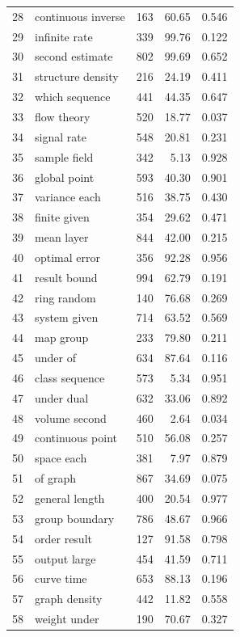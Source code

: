 \documentclass[11pt]{article}
\begin{document}
\begin{longtable}{rlrrr}
  28 & continuous inverse & 163 & 60.65 & 0.546 \\
  29 & infinite rate & 339 & 99.76 & 0.122 \\
  30 & second estimate & 802 & 99.69 & 0.652 \\
  31 & structure density & 216 & 24.19 & 0.411 \\
  32 & which sequence & 441 & 44.35 & 0.647 \\
  33 & flow theory & 520 & 18.77 & 0.037 \\
  34 & signal rate & 548 & 20.81 & 0.231 \\
  35 & sample field & 342 & 5.13 & 0.928 \\
  36 & global point & 593 & 40.30 & 0.901 \\
  37 & variance each & 516 & 38.75 & 0.430 \\
  38 & finite given & 354 & 29.62 & 0.471 \\
  39 & mean layer & 844 & 42.00 & 0.215 \\
  40 & optimal error & 356 & 92.28 & 0.956 \\
  41 & result bound & 994 & 62.79 & 0.191 \\
  42 & ring random & 140 & 76.68 & 0.269 \\
  43 & system given & 714 & 63.52 & 0.569 \\
  44 & map group & 233 & 79.80 & 0.211 \\
  45 & under of & 634 & 87.64 & 0.116 \\
  46 & class sequence & 573 & 5.34 & 0.951 \\
  47 & under dual & 632 & 33.06 & 0.892 \\
  48 & volume second & 460 & 2.64 & 0.034 \\
  49 & continuous point & 510 & 56.08 & 0.257 \\
  50 & space each & 381 & 7.97 & 0.879 \\
  51 & of graph & 867 & 34.69 & 0.075 \\
  52 & general length & 400 & 20.54 & 0.977 \\
  53 & group boundary & 786 & 48.67 & 0.966 \\
  54 & order result & 127 & 91.58 & 0.798 \\
  55 & output large & 454 & 41.59 & 0.711 \\
  56 & curve time & 653 & 88.13 & 0.196 \\
  57 & graph density & 442 & 11.82 & 0.558 \\
  58 & weight under & 190 & 70.67 & 0.327 \\

\end{longtable}
\end{document}
